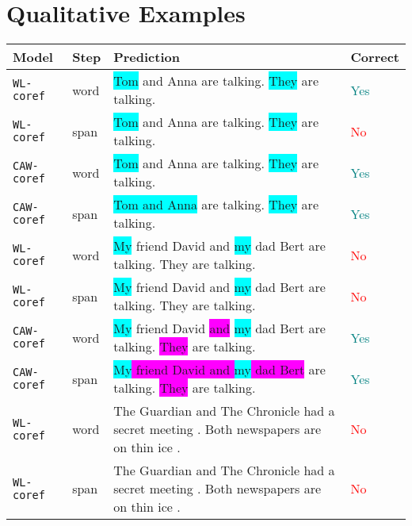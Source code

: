 \documentclass[11pt]{article}
\newcommand\wlcoref{{\texttt{WL-coref}}}
\newcommand\cawcoref{{\texttt{CAW-coref}}}
\begin{document}



\clearpage
\onecolumn

\appendix

\section{Qualitative Examples}
\label{app:qual-examples}



\begin{table}[t]\centering
    \begin{tabularx}{\textwidth}{l|l|X|l} \toprule
        \textbf{Model} & \textbf{Step} & \textbf{Prediction} & \textbf{Correct} \\ \midrule
         \wlcoref{} & word &  \colorbox{cyan}{Tom} and Anna are talking. \colorbox{cyan}{They} are talking. & \textcolor{teal}{Yes}\\
         \wlcoref{} & span & \colorbox{cyan}{Tom} and Anna are talking. \colorbox{cyan}{They} are talking. & \textcolor{red}{No}\\ 
         \cawcoref{} & word &  \colorbox{cyan}{Tom} and Anna are talking. \colorbox{cyan}{They} are talking. & \textcolor{teal}{Yes}\\
         \cawcoref{} & span & \colorbox{cyan}{Tom and Anna} are talking. \colorbox{cyan}{They} are talking. & \textcolor{teal}{Yes}\\ \midrule
         \wlcoref{} & word &  \colorbox{cyan}{My} friend David and \colorbox{cyan}{my} dad Bert are talking. They are talking. & \textcolor{red}{No}\\
         \wlcoref{} & span & \colorbox{cyan}{My} friend David and \colorbox{cyan}{my} dad Bert are talking. They are talking. & \textcolor{red}{No}\\ 
         \cawcoref{} & word &  \colorbox{cyan}{My} friend David \colorbox{magenta}{and} \colorbox{cyan}{my} dad Bert are talking. \colorbox{magenta}{They} are talking. & \textcolor{teal}{Yes}\\
         \cawcoref{} & span & \colorbox{magenta}{\colorbox{cyan}{My} friend David and \colorbox{cyan}{my} dad Bert} are talking. \colorbox{magenta}{They} are talking. & \textcolor{teal}{Yes}\\ \midrule
         \wlcoref{} & word &  The Guardian and The Chronicle had a secret meeting . Both newspapers are on thin ice . & \textcolor{red}{No}\\
         \wlcoref{} & span & The Guardian and The Chronicle had a secret meeting . Both newspapers are on thin ice . & \textcolor{red}{No}\\ 

\end{tabularx}
\end{table}
\end{document}
